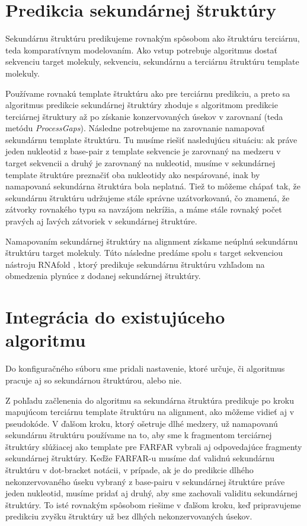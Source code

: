 \section{Predikcia sekundárnej štruktúry}
Sekundárnu štruktúru predikujeme rovnakým spôsobom ako štruktúru terciárnu, teda komparatívnym modelovaním. Ako vstup potrebuje algoritmus dostať sekvenciu target molekuly, sekvenciu, sekundárnu  a terciárnu štruktúru template molekuly. 


\indent  Používame rovnakú template štruktúru ako pre terciárnu predikciu, a preto sa algoritmus predikcie sekundárnej štruktúry zhoduje s algoritmom predikcie terciárnej štruktury až po získanie konzervovaných úsekov v zarovnaní (teda metódu \textit{ProcessGaps}). Následne potrebujeme na zarovnanie namapovať sekundárnu template štruktúru. Tu musíme riešiť nasledujúcu situáciu: ak práve jeden nukleotid z base-pair z template sekvencie je zarovnaný na medzeru v target sekvencii a druhý je zarovnaný na nukleotid, musíme v sekundárnej template štruktúre preznačiť oba nukleotidy ako nespárované, inak by namapovaná sekundárna štruktúra bola neplatná. Tiež to môžeme chápať tak, že sekundárnu štruktúru udržujeme stále správne uzátvorkovanú, čo znamená, že zátvorky rovnakého typu sa navzájom nekrížia, a máme stále rovnaký počet pravých aj ľavých zátvoriek v sekundárnej štruktúre.


\indent Namapovaním sekundárnej štruktúry na alignment získame neúplnú sekundárnu štruktúru target molekuly. Túto následne predáme spolu s target sekvenciou nástroju RNAfold \cite{RNAfold}, ktorý predikuje sekundárnu štruktúru vzhľadom na obmedzenia plynúce z dodanej sekundárnej štruktúry. 


\section{Integrácia do existujúceho algoritmu}
Do konfiguračného súboru sme pridali nastavenie, ktoré určuje, či algoritmus pracuje aj so sekundárnou štruktúrou, alebo nie.


\indent Z pohľadu začlenenia do algoritmu sa sekundárna štruktúra predikuje po kroku mapujúcom terciárnu template štruktúru na alignment, ako môžeme vidieť aj v pseudokóde. V ďalšom kroku, ktorý ošetruje dlhé medzery, už namapovanú sekundárnu štruktúru používame na to, aby sme k fragmentom terciárnej štruktúry slúžiacej ako template pre FARFAR vybrali aj odpovedajúce fragmenty sekundárnej štruktúry. Keďže FARFAR-u musíme dať validnú sekundárnu štruktúru v dot-bracket notácii, v prípade, ak je do predikcie dlhého nekonzervovaného úseku vybraný z base-pairu v sekundárnej štruktúre práve jeden nukleotid, musíme pridať aj druhý, aby sme zachovali validitu sekundárnej štruktúry. To isté rovnakým spôsobom riešime v ďalšom kroku, keď pripravujeme predikciu zvyšku štruktúry už bez dlhých nekonzervovaných úsekov. 


